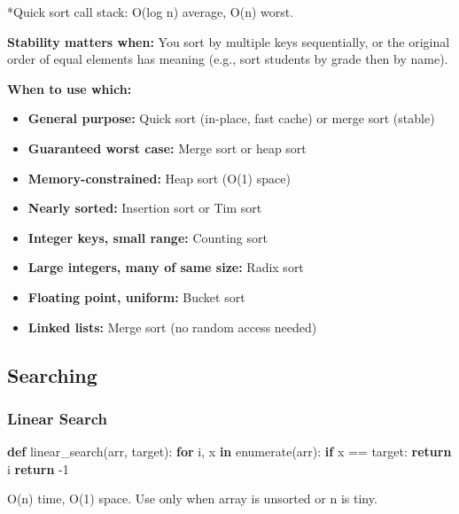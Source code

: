 \documentclass[11pt]{article}
\providecommand{\tightlist}{\setlength{\itemsep}{1pt}\setlength{\parskip}{0pt}}
\newenvironment{Shaded}{\begin{snugshade}}{\end{snugshade}}
\newcommand{\BuiltInTok}[1]{\textcolor[rgb]{0.50,0.55,0.55}{#1}}
\newcommand{\ControlFlowTok}[1]{\textcolor[rgb]{0.99,0.74,0.29}{\textbf{#1}}}
\newcommand{\DecValTok}[1]{\textcolor[rgb]{0.96,0.45,0.00}{#1}}
\newcommand{\KeywordTok}[1]{\textcolor[rgb]{0.81,0.81,0.76}{\textbf{#1}}}
\newcommand{\NormalTok}[1]{\textcolor[rgb]{0.81,0.81,0.76}{#1}}
\newcommand{\OperatorTok}[1]{\textcolor[rgb]{0.81,0.81,0.76}{#1}}
\begin{document}
*Quick sort call stack: O(log n) average, O(n) worst.

\textbf{Stability matters when:} You sort by multiple keys sequentially, or the original order of equal elements has meaning (e.g., sort students by grade then by name).

\textbf{When to use which:}

\begin{itemize}
\tightlist
\item
  \textbf{General purpose:} Quick sort (in-place, fast cache) or merge sort (stable)
\item
  \textbf{Guaranteed worst case:} Merge sort or heap sort
\item
  \textbf{Memory-constrained:} Heap sort (O(1) space)
\item
  \textbf{Nearly sorted:} Insertion sort or Tim sort
\item
  \textbf{Integer keys, small range:} Counting sort
\item
  \textbf{Large integers, many of same size:} Radix sort
\item
  \textbf{Floating point, uniform:} Bucket sort
\item
  \textbf{Linked lists:} Merge sort (no random access needed)
\end{itemize}

\subsection{Searching}\label{searching}

\subsubsection{Linear Search}\label{linear-search}


\begin{Shaded}
\begin{Highlighting}[]
\KeywordTok{def}\NormalTok{ linear\_search(arr, target):}
    \ControlFlowTok{for}\NormalTok{ i, x }\KeywordTok{in} \BuiltInTok{enumerate}\NormalTok{(arr):}
        \ControlFlowTok{if}\NormalTok{ x }\OperatorTok{==}\NormalTok{ target:}
            \ControlFlowTok{return}\NormalTok{ i}
    \ControlFlowTok{return} \OperatorTok{{-}}\DecValTok{1}
\end{Highlighting}
\end{Shaded}

O(n) time, O(1) space. Use only when array is unsorted or n is tiny.
\end{document}
